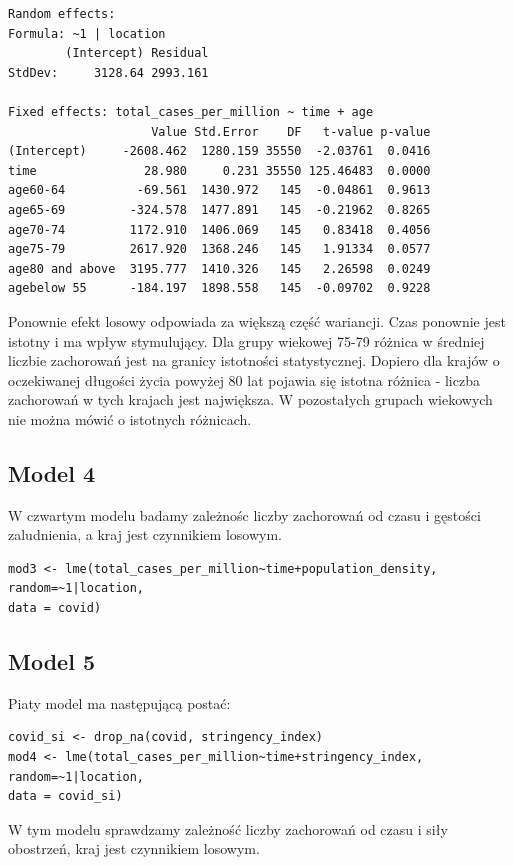 \documentclass[12pt]{mwbk}
\theoremstyle{plain}
\theoremstyle{definition}
\theoremstyle{remark}
\begin{document}
\begin{verbatim}
Random effects:
Formula: ~1 | location
        (Intercept) Residual
StdDev:     3128.64 2993.161

Fixed effects: total_cases_per_million ~ time + age 
                    Value Std.Error    DF   t-value p-value
(Intercept)     -2608.462  1280.159 35550  -2.03761  0.0416
time               28.980     0.231 35550 125.46483  0.0000
age60-64          -69.561  1430.972   145  -0.04861  0.9613
age65-69         -324.578  1477.891   145  -0.21962  0.8265
age70-74         1172.910  1406.069   145   0.83418  0.4056
age75-79         2617.920  1368.246   145   1.91334  0.0577
age80 and above  3195.777  1410.326   145   2.26598  0.0249
agebelow 55      -184.197  1898.558   145  -0.09702  0.9228
\end{verbatim}

Ponownie efekt losowy odpowiada za większą część wariancji. Czas ponownie jest istotny i ma wpływ stymulujący. Dla grupy wiekowej 75-79 różnica w średniej liczbie zachorowań jest na granicy istotności statystycznej. Dopiero dla krajów o oczekiwanej długości życia powyżej 80 lat pojawia się istotna różnica - liczba zachorowań w tych krajach jest największa. W pozostałych grupach wiekowych nie można mówić o istotnych różnicach. 
\subsection{Model 4}

W czwartym modelu badamy zależnośc liczby zachorowań od czasu i gęstości zaludnienia, a kraj jest czynnikiem losowym.

\begin{verbatim}
mod3 <- lme(total_cases_per_million~time+population_density,
random=~1|location,
data = covid)
\end{verbatim}

\subsection{Model 5}

Piaty model ma następującą postać:

\begin{verbatim}
covid_si <- drop_na(covid, stringency_index)
mod4 <- lme(total_cases_per_million~time+stringency_index,
random=~1|location,
data = covid_si)
\end{verbatim}

W tym modelu sprawdzamy zależność liczby zachorowań od czasu i siły obostrzeń, kraj jest czynnikiem losowym.
\end{document}

